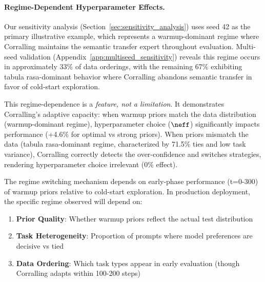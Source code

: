 
\paragraph{Regime-Dependent Hyperparameter Effects.}
Our sensitivity analysis (Section~\ref{sec:sensitivity_analysis}) uses seed 42 as the primary illustrative example, which represents a warmup-dominant regime where Corralling maintains the semantic transfer expert throughout evaluation. Multi-seed validation (Appendix~\ref{app:multiseed_sensitivity}) reveals this regime occurs in approximately 33\% of data orderings, with the remaining 67\% exhibiting tabula rasa-dominant behavior where Corralling abandons semantic transfer in favor of cold-start exploration.

This regime-dependence is a \textit{feature, not a limitation}. It demonstrates Corralling's adaptive capacity: when warmup priors match the data distribution (warmup-dominant regime), hyperparameter choice ($\neff$) significantly impacts performance (+4.6\% for optimal vs strong priors). When priors mismatch the data (tabula rasa-dominant regime, characterized by 71.5\% ties and low task variance), Corralling correctly detects the over-confidence and switches strategies, rendering hyperparameter choice irrelevant (0\% effect).

The regime switching mechanism depends on early-phase performance (t=0-300) of warmup priors relative to cold-start exploration. In production deployment, the specific regime observed will depend on:
\begin{enumerate}[leftmargin=*, itemsep=2pt]
    \item \textbf{Prior Quality}: Whether warmup priors reflect the actual test distribution
    \item \textbf{Task Heterogeneity}: Proportion of prompts where model preferences are decisive vs tied
    \item \textbf{Data Ordering}: Which task types appear in early evaluation (though Corralling adapts within 100-200 steps)
\end{enumerate}

